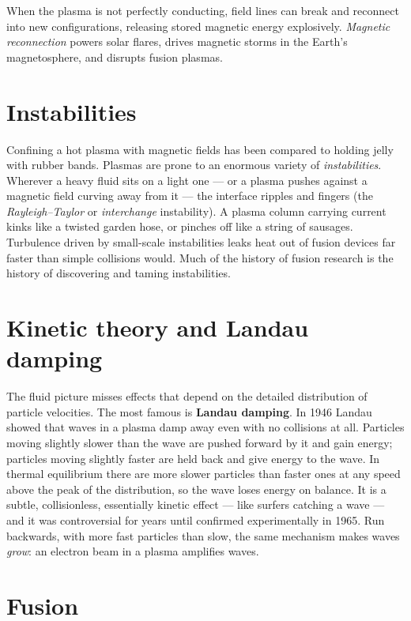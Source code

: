 When the plasma is not perfectly conducting, field lines can break and reconnect into new configurations, releasing stored magnetic energy explosively. \emph{Magnetic reconnection} powers solar flares, drives magnetic storms in the Earth's magnetosphere, and disrupts fusion plasmas.

\section{Instabilities}

Confining a hot plasma with magnetic fields has been compared to holding jelly with rubber bands. Plasmas are prone to an enormous variety of \emph{instabilities}. Wherever a heavy fluid sits on a light one --- or a plasma pushes against a magnetic field curving away from it --- the interface ripples and fingers (the \emph{Rayleigh--Taylor} or \emph{interchange} instability). A plasma column carrying current kinks like a twisted garden hose, or pinches off like a string of sausages. Turbulence driven by small-scale instabilities leaks heat out of fusion devices far faster than simple collisions would. Much of the history of fusion research is the history of discovering and taming instabilities.

\section{Kinetic theory and Landau damping}

The fluid picture misses effects that depend on the detailed distribution of particle velocities. The most famous is \textbf{Landau damping}. In 1946 Landau showed that waves in a plasma damp away even with no collisions at all. Particles moving slightly slower than the wave are pushed forward by it and gain energy; particles moving slightly faster are held back and give energy to the wave. In thermal equilibrium there are more slower particles than faster ones at any speed above the peak of the distribution, so the wave loses energy on balance. It is a subtle, collisionless, essentially kinetic effect --- like surfers catching a wave --- and it was controversial for years until confirmed experimentally in 1965. Run backwards, with more fast particles than slow, the same mechanism makes waves \emph{grow}: an electron beam in a plasma amplifies waves.

\section{Fusion}

